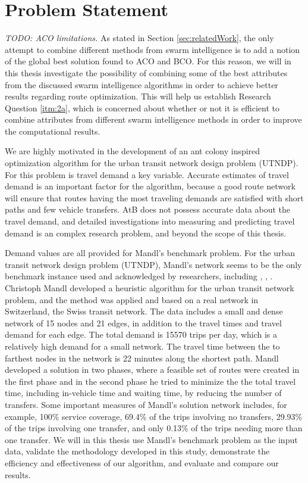 \section{Problem Statement}
\emph{\color{blue}TODO: ACO limitations.} As stated in Section \vref{sec:relatedWork}, the only attempt to combine different methods from swarm intelligence is to add a notion of the global best solution found to ACO and BCO. For this reason, we will in this thesis investigate the possibility of combining some of the best attributes from the discussed swarm intelligence algorithms in order to achieve better results regarding route optimization. This will help us establish Research Question \vref{itm:2a}, which is concerned about whether or not it is efficient to combine attributes from different swarm intelligence methods in order to improve the computational results.

We are highly motivated in the development of an ant colony inspired optimization algorithm for the urban transit network design problem (UTNDP). For this problem is travel demand a key variable. Accurate estimates of travel demand is an important factor for the algorithm, because a good route network will ensure that routes having the most traveling demands are satisfied with short paths and few vehicle transfers. AtB does not possess accurate data about the travel demand, and detailed investigations into measuring and predicting travel demand is an complex research problem, and beyond the scope of this thesis. 

Demand values are all provided for Mandl's benchmark problem. For the urban transit network design problem (UTNDP), Mandl's network seems to be the only benchmark instance used and acknowledged by researchers, including \citep{fan09}, \citep{kechagiopoulos14}, \citep{nikolic14}. Christoph Mandl \citep{mandl79} developed a heuristic algorithm for the urban transit network problem, and the method was applied and based on a real network in Switzerland, the Swiss transit network\citep{mandl80}. The data includes a small and dense network of 15 nodes and 21 edges, in addition to the travel times and travel demand for each edge. The total demand is 15570 trips per day, which is a relatively high demand for a small network. The travel time between the to farthest nodes in the network is 22 minutes along the shortest path. Mandl developed a solution in two phases, where a feasible set of routes were created in the first phase and in the second phase he tried to minimize the the total travel time, including in-vehicle time and waiting time, by reducing the number of transfers. Some important measures of Mandl's solution network includes, for example, 100\% service coverage, 69.4\% of the trips involving no transfers, 29.93\% of the trips involving one transfer, and only 0.13\% of the trips needing more than one transfer. We will in this thesis use Mandl's benchmark problem \citep{mandl79} as the input data, validate the methodology developed in this study, demonstrate the efficiency and effectiveness of our algorithm, and evaluate and compare our results. 

